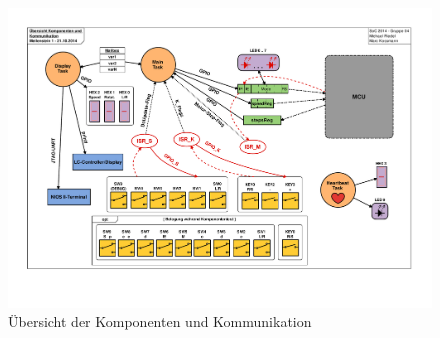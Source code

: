 \documentclass[ngerman,fontsize=12pt , paper=a4 , twoside=false , DIV12 , BCOR=1cm ,
numbers=enddot , listof=totoc , bibliography=totoc , index=totoc ,
headings=small , headlines=1.5 , final]{scrbook}
\begin{document}
\begin{figure}[htbp]
\centering
\includegraphics{../Diagrams/Uebersicht_Komponenten_und_Kommunikation.pdf}
\caption{Übersicht der Komponenten und
Kommunikation\label{fig:kommunikation}}
\end{figure}

\newpage

  {
    \backmatter
  }{}



\printnoidxglossary[style=list_auto,title=Abkürzungsverzeichnis]
\newpage
{}
{
  \listoffigures
}{}
{
  \listofalgorithms
}{}
{
  \listoflistings
}{}
{
  \listoftables
}{}
\newpage
\end{document}
